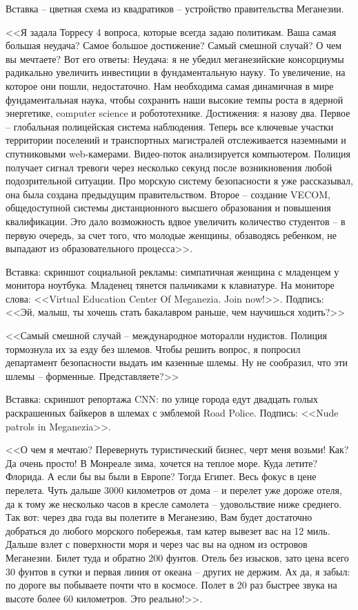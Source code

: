 Вставка -- цветная схема из квадратиков -- устройство правительства Меганезии.

<<Я задала Торресу 4 вопроса, которые всегда задаю политикам. Ваша самая большая неудача? Самое большое достижение? Самый смешной случай? О чем вы мечтаете?
Вот его ответы:
Неудача: я не убедил меганезийские консорциумы радикально увеличить инвестиции в фундаментальную науку. То увеличение, на которое они пошли, недостаточно. Нам необходима самая динамичная в мире фундаментальная наука, чтобы сохранить наши высокие темпы роста в ядерной энергетике, computer science и робототехнике.
Достижения: я назову два. Первое -- глобальная полицейская система наблюдения. Теперь все ключевые участки территории поселений и транспортных магистралей отслеживается наземными и спутниковыми web-камерами. Видео-поток анализируется компьютером. Полиция получает сигнал тревоги через несколько секунд после возникновения любой подозрительной ситуации. Про морскую систему безопасности я уже рассказывал, она была создана предыдущим правительством. Второе -- создание VECOM, общедоступной системы дистанционного высшего образования и повышения квалификации. Это дало возможность вдвое увеличить количество студентов -- в первую очередь, за счет того, что молодые женщины, обзаводясь ребенком, не выпадают из образовательного процесса>>.

Вставка: скриншот социальной рекламы: симпатичная женщина с младенцем у монитора ноутбука. Младенец тянется пальчиками к клавиатуре. На мониторе слова: <<Virtual Education Center Of Meganezia. Join now!>>. Подпись: <<Эй, малыш, ты хочешь стать бакалавром раньше, чем научишься ходить?>>

<<Самый смешной случай -- международное моторалли нудистов. Полиция тормознула их за езду без шлемов. Чтобы решить вопрос, я попросил департамент безопасности выдать им казенные шлемы. Ну не сообразил, что эти шлемы -- форменные. Представляете?>>

Вставка: скриншот репортажа CNN: по улице города едут двадцать голых раскрашенных байкеров в шлемах с эмблемой Road Police. Подпись: <<Nude patrols in Meganezia>>.

<<О чем я мечтаю? Перевернуть туристический бизнес, черт меня возьми! Как? Да очень просто! В Монреале зима, хочется на теплое море. Куда летите? Флорида. А если бы вы были в Европе? Тогда Египет. Весь фокус в цене перелета. Чуть дальше 3000 километров от дома -- и перелет уже дороже отеля, да к тому же несколько часов в кресле самолета -- удовольствие ниже среднего. Так вот: через два года вы полетите в Меганезию, Вам будет достаточно добраться до любого морского побережья, там катер вывезет вас на 12 миль. Дальше взлет с поверхности моря и через час вы на одном из островов Меганезии. Билет туда и обратно 200 фунтов. Отель без изысков, зато цена всего 30 фунтов в сутки и первая линия от океана -- других не держим. Ах да, я забыл: по дороге вы побываете почти что в космосе. Полет в 20 раз быстрее звука на высоте более 60 километров. Это реально!>>.

